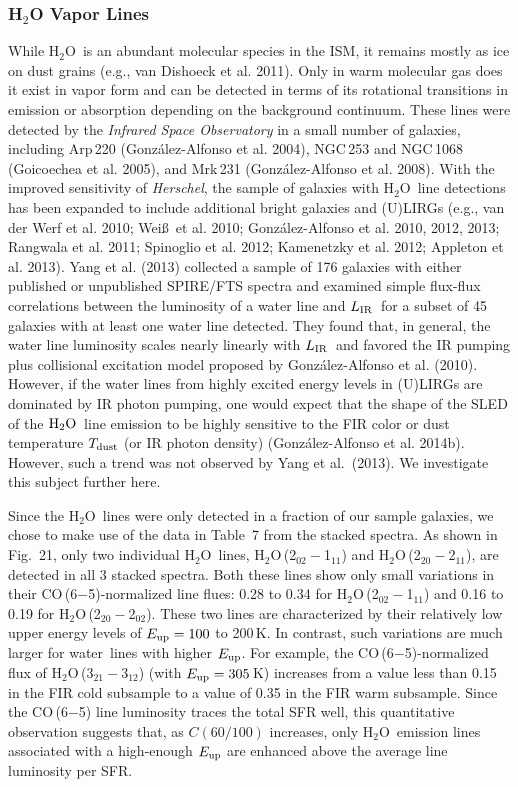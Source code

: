 \documentclass[preprint]{aastex}
\newcommand{\Herschel}{{\it Herschel}}
\newcommand{\Water}{\mbox{${\rm H}_2{\rm O}$}}
\newcommand{\LIR}{\mbox{$L_{\rm IR}$}}
\newcommand{\water}{\mbox{H$_2$O}}
\begin{document}
\subsubsection{H$_2$O Vapor Lines} \label{sec5.7.1}

While \water\ is an abundant molecular species in the ISM, it remains mostly as ice 
on dust grains (e.g., van Dishoeck et al. 2011). 
Only in warm molecular gas does it exist in vapor form and can be detected in 
terms of its rotational transitions in emission or absorption depending on 
the background continuum. These lines were 
detected by the {\it Infrared Space Observatory} in a small number of galaxies, 
including Arp\,220 (Gonz\'alez-Alfonso
et al. 2004), NGC\,253 and NGC\,1068 (Goicoechea et al. 2005), and Mrk\,231 
(Gonz\'alez-Alfonso et al. 2008). With the improved sensitivity of \Herschel, 
the sample of galaxies with \water\ line detections has been expanded to include 
additional bright galaxies and 
(U)LIRGs (e.g., van der Werf et al. 2010; Wei\ss\ et al. 2010; Gonz\'alez-Alfonso 
et al. 2010, 2012, 2013; Rangwala et al. 2011; Spinoglio et al. 2012; 
Kamenetzky et al. 2012; Appleton et al. 2013).  Yang et al. (2013) collected a sample 
of 176 galaxies with either published or unpublished SPIRE/FTS spectra and examined 
simple flux-flux correlations between the luminosity of a water
line and \LIR\ for a subset of 45 galaxies with at least one water line detected. 
They found that, in general, the water line luminosity scales nearly linearly 
with \LIR\  and favored the IR pumping plus collisional excitation model proposed 
by Gonz\'alez-Alfonso et al. (2010). However, if the water lines from highly 
excited energy levels in (U)LIRGs are dominated by IR photon pumping, one would 
expect that the shape of the SLED of the \Water\ line emission to be highly
sensitive to the FIR color or dust temperature $T_{\rm dust}$ (or IR photon density) 
(Gonz\'alez-Alfonso et al. 2014b).  However, such a trend was not observed by 
Yang et al.~(2013).  We investigate this subject further here.


Since the \water\ lines were only detected in a fraction of our sample galaxies,
we chose to make use of the data in Table~7 from the stacked spectra.  
As shown in Fig.~21, only two individual \water\ lines, \water\,(2$_{02} - $1$_{11}$) 
and \water\,(2$_{20} - $2$_{11}$), are detected in all 3 stacked spectra.  
Both these lines show only small variations in their CO\,(6$-$5)-normalized 
line flues: 0.28 to 0.34 for \water\,(2$_{02} - $1$_{11}$) and 0.16 to 0.19 for
\water\,(2$_{20} - $2$_{02}$).  These two lines are characterized by their 
relatively low upper energy levels of $E_{\rm up} = 100$ to 200\,K. 
In contrast, such variations are much larger for water\ lines with higher 
$E_{\rm up}$.   For example, the CO\,(6$-$5)-normalized flux of 
\water\,(3$_{21} - $3$_{12}$) (with $E_{\rm up} = 305$\,K) increases from a value
less than 0.15 in the FIR cold subsample to a value of 0.35 in the FIR warm subsample. 
Since the CO\,(6$-$5) line luminosity traces the total SFR well, this quantitative 
observation suggests that, as $C(60/100)$ increases, only \water\ emission lines
associated with a high-enough $E_{\rm up}$ are enhanced above the average line 
luminosity per SFR.
\end{document}
